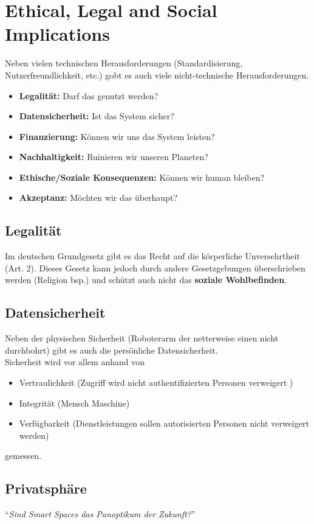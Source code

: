 \documentclass[a4paper]{article}
\begin{document}
\newpage
\section{Ethical, Legal and Social Implications}
Neben vielen technischen Herausforderungen (Standardisierung, Nutzerfreundlichkeit, etc.) gobt es auch viele nicht-technische Herausforderungen.
\begin{itemize}
	\item \textbf{Legalität:} Darf das genutzt werden?
	\item \textbf{Datensicherheit:} Ist das System sicher?
	\item \textbf{Finanzierung:} Können wir uns das System leisten?
	\item \textbf{Nachhaltigkeit:} Ruinieren wir unseren Planeten?
	\item \textbf{Ethische/Soziale Konsequenzen:} Können wir human bleiben?
	\item \textbf{Akzeptanz:} Möchten wir das überhaupt?
\end{itemize}

\subsection{Legalität}
Im deutschen Grundgesetz gibt es das Recht auf die körperliche Unversehrtheit (Art. 2). Dieses Gesetz kann jedoch durch andere Gesetzgebungen überschrieben werden (Religion bsp.) und schützt auch nicht das \textbf{soziale Wohlbefinden}.

\subsection{Datensicherheit}
Neben der physischen Sicherheit (Roboterarm der netterweise einen nicht durchbohrt) gibt es auch die persönliche Datensicherheit.\\
Sicherheit wird vor allem anhand von
\begin{itemize}
	\item Vertraulichkeit (Zugriff wird nicht authentifizierten Personen verweigert )
	\item Integrität (Mensch Maschine)
	\item Verfügbarkeit (Dienstleistungen sollen autorisierten Personen nicht verweigert werden)
\end{itemize}
gemessen.

\subsection{Privatsphäre}
``\textit{Sind Smart Spaces das Panoptikum der Zukunft?}''\\
\end{document}
